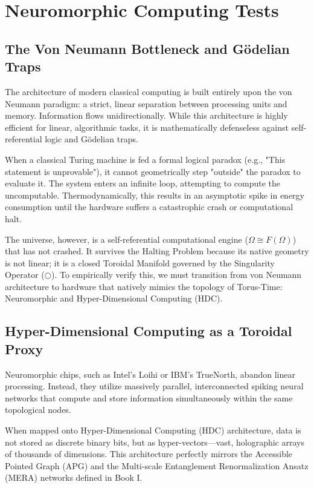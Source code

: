 \documentclass[12pt,openany]{book}
\begin{document}
\chapter{Neuromorphic Computing Tests}

\section{The Von Neumann Bottleneck and G\"{o}delian Traps}
The architecture of modern classical computing is built entirely upon the von Neumann paradigm: a strict, linear separation between processing units and memory. Information flows unidirectionally. While this architecture is highly efficient for linear, algorithmic tasks, it is mathematically defenseless against self-referential logic and G\"{o}delian traps. 

When a classical Turing machine is fed a formal logical paradox (e.g., "This statement is unprovable"), it cannot geometrically step "outside" the paradox to evaluate it. The system enters an infinite loop, attempting to compute the uncomputable. Thermodynamically, this results in an asymptotic spike in energy consumption until the hardware suffers a catastrophic crash or computational halt. 

The universe, however, is a self-referential computational engine ($\Omega \cong F(\Omega)$) that has not crashed. It survives the Halting Problem because its native geometry is not linear; it is a closed Toroidal Manifold governed by the Singularity Operator ($\bigcirc$). To empirically verify this, we must transition from von Neumann architecture to hardware that natively mimics the topology of Torus-Time: Neuromorphic and Hyper-Dimensional Computing (HDC).

\section{Hyper-Dimensional Computing as a Toroidal Proxy}
Neuromorphic chips, such as Intel's Loihi or IBM's TrueNorth, abandon linear processing. Instead, they utilize massively parallel, interconnected spiking neural networks that compute and store information simultaneously within the same topological nodes. 

When mapped onto Hyper-Dimensional Computing (HDC) architecture, data is not stored as discrete binary bits, but as hyper-vectors—vast, holographic arrays of thousands of dimensions. This architecture perfectly mirrors the Accessible Pointed Graph (APG) and the Multi-scale Entanglement Renormalization Ansatz (MERA) networks defined in Book I. 
\end{document}
